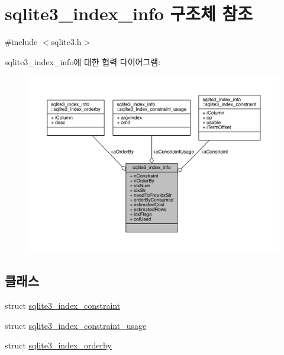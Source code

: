 \hypertarget{structsqlite3__index__info}{}\section{sqlite3\+\_\+index\+\_\+info 구조체 참조}
\label{structsqlite3__index__info}


{\ttfamily \#include $<$sqlite3.\+h$>$}



sqlite3\+\_\+index\+\_\+info에 대한 협력 다이어그램\+:
\nopagebreak
\begin{figure}[H]
\begin{center}
\leavevmode
\includegraphics[width=350pt]{structsqlite3__index__info__coll__graph}
\end{center}
\end{figure}
\subsection*{클래스}
\begin{DoxyCompactItemize}
\item 
struct \hyperlink{structsqlite3__index__info_1_1sqlite3__index__constraint}{sqlite3\+\_\+index\+\_\+constraint}
\item 
struct \hyperlink{structsqlite3__index__info_1_1sqlite3__index__constraint__usage}{sqlite3\+\_\+index\+\_\+constraint\+\_\+usage}
\item 
struct \hyperlink{structsqlite3__index__info_1_1sqlite3__index__orderby}{sqlite3\+\_\+index\+\_\+orderby}
\end{DoxyCompactItemize}
